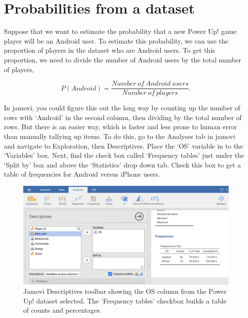\documentclass[
  openany]{scrbook}
\begin{document}
\hypertarget{probabilities-from-a-dataset}{%
\section{Probabilities from a dataset}\label{probabilities-from-a-dataset}}

Suppose that we want to estimate the probability that a new Power Up! game player will be an Android user.
To estimate this probability, we can use the proportion of players in the dataset who are Android users.
To get this proportion, we need to divide the number of Android users by the total number of players,

\[P(Android) = \frac{Number\:of\:Android\:users}{Number\:of\:players}.\]

In jamovi, you could figure this out the long way by counting up the number of rows with `Android' in the second column, then dividing by the total number of rows.
But there is an easier way, which is faster and less prone to human error than manually tallying up items.
To do this, go to the Analyses tab in jamovi and navigate to Exploration, then Descriptives.
Place the `OS' variable in to the `Variables' box.
Next, find the check box called `Frequency tables' just under the `Split by' box and above the `Statistics' drop down tab.
Check this box to get a table of frequencies for Android versus iPhone users.

\begin{figure}
\includegraphics[width=1\linewidth]{img/jamovi_power_up_frequencies} \caption{Jamovi Descriptives toolbar showing the OS column from the Power Up! dataset selected. The 'Frequency tables' checkbox builds a table of counts and percentages.}\label{fig:unnamed-chunk-65}
\end{figure}
\end{document}
